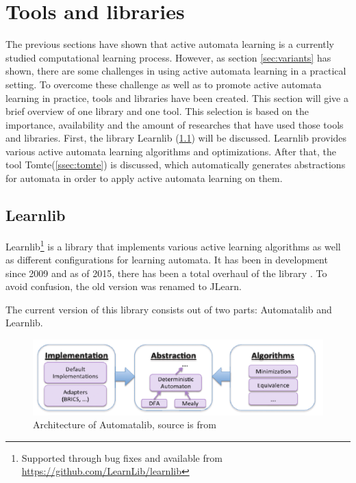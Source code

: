 \documentclass[multi,crop=false,class=article]{standalone}
\begin{document}
\section{Tools and libraries}
\label{sec:tools}
The previous sections have shown that active automata learning is a currently
studied computational learning process. However, as section
\ref{sec:variants} has shown, there are some challenges in using active
automata learning in a practical setting. To overcome these challenge as well
as to promote active automata learning in practice, tools and libraries have
been created. This section will give a brief overview of one library and one
tool. This selection is based on the importance, availability and the amount of
researches that have used those tools and libraries. First, the library
Learnlib (\ref{ssec:learnlib}) will be discussed. Learnlib provides various
active automata learning algorithms and optimizations. After that, the tool
Tomte(\ref{ssec:tomte}) is discussed, which automatically generates
abstractions for automata in order to apply active automata learning on them.

\subsection{Learnlib}
\label{ssec:learnlib}

Learnlib\footnote{Supported through bug fixes and available from
\url{https://github.com/LearnLib/learnlib}} is a library that implements various
active learning algorithms as well as different configurations for learning
automata. It has been in development since 2009 \cite{Raffelt2009} and as of
2015, there has been a total overhaul of the library \cite{Isberner2015b}. To
avoid confusion, the old version was renamed to JLearn.

The current version of this library consists out of two parts: Automatalib and
Learnlib.

\begin{figure}[!ht]
	\includegraphics[width=\textwidth]{Tool_images/automatalib_architecture.png}
	\caption{Architecture of Automatalib, source is from \cite{Isberner2015b}}
	\label{fig:automatalib_arch}
\end{figure}
\end{document}
